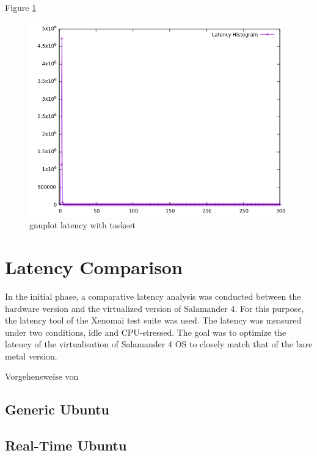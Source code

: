 \documentclass[MMR,Master,english]{twbook}
\begin{document}
Figure \ref{fig:gnuplot_max_latency_vapic}
\begin{figure}[H]
	\centering
	\includegraphics[width=0.8\columnwidth]{masterthesis-documentation/docs/sigmatek/xenomai/vapic/gnuplot_max_latency_vapic.png}
	\caption[gnuplot latency with taskset]{gnuplot latency with taskset}
	\label{fig:gnuplot_max_latency_vapic}
\end{figure}


\clearpage

\section{Latency Comparison}
In the initial phase, a comparative latency analysis was conducted between the hardware version and the virtualized version of Salamander 4. For this purpose, the latency tool of the Xenomai test suite was used. The latency was measured under two conditions, idle and CPU-stressed. The goal was to optimize the latency of the virtualisation of Salamander 4 OS to closely match that of the bare metal version.

Vorgehensweise von \cite{linPerformanceEvaluationXenomai}


\subsection{Generic Ubuntu}

\subsection{Real-Time Ubuntu}




\end{document}
